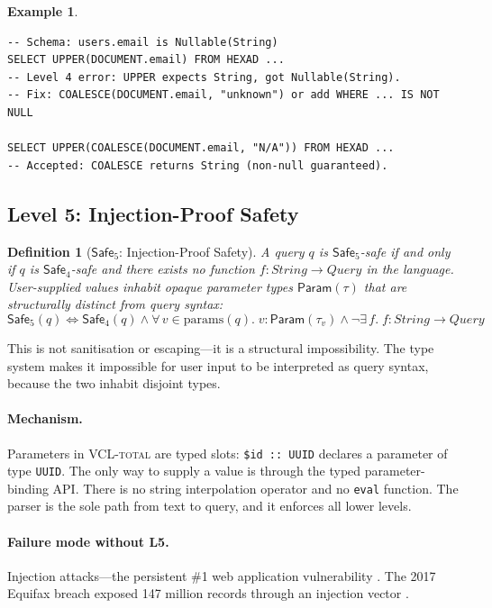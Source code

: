 \documentclass[11pt,a4paper]{article}
\newtheorem{definition}[theorem]{Definition}
\newtheorem{example}[theorem]{Example}
\newcommand{\VCL}{\textsc{VCL-total}}
\newcommand{\LevelN}[1]{\textsf{L#1}}
\newcommand{\Safe}[1]{\ensuremath{\mathsf{Safe}_{#1}}}
\begin{document}
\begin{example}
\begin{lstlisting}[language=VCL]
-- Schema: users.email is Nullable(String)
SELECT UPPER(DOCUMENT.email) FROM HEXAD ...
-- Level 4 error: UPPER expects String, got Nullable(String).
-- Fix: COALESCE(DOCUMENT.email, "unknown") or add WHERE ... IS NOT NULL

SELECT UPPER(COALESCE(DOCUMENT.email, "N/A")) FROM HEXAD ...
-- Accepted: COALESCE returns String (non-null guaranteed).
\end{lstlisting}
\end{example}

\subsection{Level 5: Injection-Proof Safety}\label{sec:L5}

\begin{definition}[\Safe{5}: Injection-Proof Safety]
A query $q$ is \Safe{5}-safe if and only if $q$ is \Safe{4}-safe and
there exists no function $f : \mathit{String} \to \mathit{Query}$ in
the language.  User-supplied values inhabit opaque parameter types
$\mathsf{Param}(\tau)$ that are structurally distinct from query syntax:
\[
  \Safe{5}(q) \iff \Safe{4}(q) \land
  \forall\, v \in \mathrm{params}(q).\; v : \mathsf{Param}(\tau_v) \land
  \neg \exists\, f.\; f : \mathit{String} \to \mathit{Query}
\]
\end{definition}

This is not sanitisation or escaping---it is a structural
impossibility.  The type system makes it impossible for user input to
be interpreted as query syntax, because the two inhabit disjoint types.

\paragraph{Mechanism.}
Parameters in \VCL{} are typed slots: \texttt{\$id :: UUID} declares a
parameter of type \texttt{UUID}.  The only way to supply a value is
through the typed parameter-binding API.  There is no string
interpolation operator and no \texttt{eval} function.  The parser is
the sole path from text to query, and it enforces all lower levels.

\paragraph{Failure mode without \LevelN{5}.}
Injection attacks---the persistent \#1 web application vulnerability
\citep{owasp2021top10}.  The 2017 Equifax breach exposed 147 million
records through an injection vector \citep{usgao2018equifax}.
\end{document}
